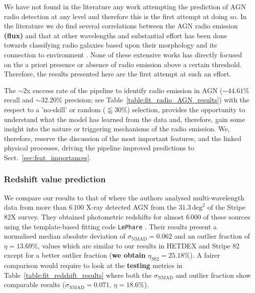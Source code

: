 \documentclass{aa}
\begin{document}
We have not found in the literature any work attempting the prediction of AGN radio detection at any level and therefore this is the first attempt at doing so. In the literature we do find several correlations between the AGN radio emission \textbf{(flux)} and that at other wavelengths \citep[e.g. with infrared emission,][]{1985ApJ...298L...7H, 1992ARA&A..30..575C} and substantial effort has been done towards classifying radio galaxies based upon their morphology \citep[e.g.][FRI, FRII, bent jets, etc.]{2017ApJS..230...20A, 2019MNRAS.482.1211W} and its connection to environment \citep{2008A&ARv..15...67M, 2022A&ARv..30....6M}. None of these extensive works has directly focused on the a priori presence or absence of radio emission above a certain threshold. Therefore, the results presented here are the first attempt at such an effort.

The ${\sim} 2$x success rate of the pipeline to identify radio emission in AGN (${\sim} 44.61\%$ recall and ${\sim} 32.20\%$ precision; see Table~\ref{table:fit_radio_AGN_results}) with the respect to a 'no-skill' or random (${\lessapprox}30 \%$) selection, provides the opportunity to understand what the model has learned from the data and, therefore, gain some insight into the nature or triggering mechanisms of the radio emission. We, therefore, reserve the discussion of the most important features, and the linked physical processes, driving the pipeline improved predictions to Sect.~\ref{sec:feat_importances}.


\subsubsection{Redshift value prediction}\label{sec:previous_z_values}

We compare our results to that of \citet[][Stripe 82X]{2017ApJ...850...66A} where the authors analysed multi-wavelength data from more than $6\,100$ X-ray detected AGN from the $31.3\, \mathrm{deg}^{2}$ of the Stripe 82X survey. They obtained photometric redshifts for almost $6\,000$ of these sources using the template-based fitting code \verb|LePhare| \citep{1999MNRAS.310..540A, 2006A&A...457..841I}. Their results present a normalised median absolute deviation of $\sigma_{\mathrm{NMAD}} = 0.062$ and an outlier fraction of $\eta = 13.69 \%$, values which are similar to our results in HETDEX and Stripe 82 except for a better outlier fraction (\textbf{we obtain} $\eta_{S82}=25.18\%$). A fairer comparison would require to look at the \textbf{testing} metrics in Table~\ref{table:fit_redshift_results} where both the $\sigma_{\mathrm{NMAD}}$ and outlier fraction show comparable results ($\sigma_{\mathrm{NMAD}} = 0.071$, $\eta = 18.6$\%).
\end{document}
